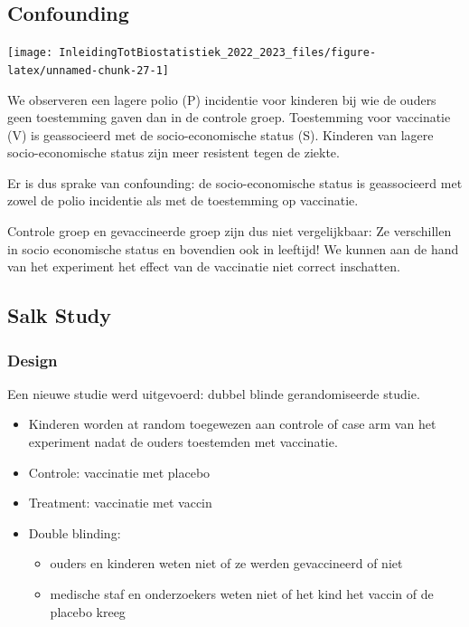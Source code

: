 \documentclass[
  12pt,dutch,coursenotes]{book}
\providecommand{\tightlist}{%
  \setlength{\itemsep}{0pt}\setlength{\parskip}{0pt}}
\begin{document}
\hypertarget{confounding}{%
\subsection{Confounding}\label{confounding}}

\begin{center}\texttt{[image: InleidingTotBiostatistiek\_2022\_2023\_files/figure-latex/unnamed-chunk-27-1]} \end{center}

We observeren een lagere polio (P) incidentie voor kinderen bij wie de ouders geen toestemming gaven dan in de controle groep.
Toestemming voor vaccinatie (V) is geassocieerd met de socio-economische status (S).
Kinderen van lagere socio-economische status zijn meer resistent tegen de ziekte.

Er is dus sprake van confounding: de socio-economische status is geassocieerd met zowel de polio incidentie als met de toestemming op vaccinatie.

Controle groep en gevaccineerde groep zijn dus niet vergelijkbaar:
Ze verschillen in socio economische status en bovendien ook in leeftijd!
We kunnen aan de hand van het experiment het effect van de vaccinatie niet correct inschatten.

\hypertarget{salk-study}{%
\subsection{Salk Study}\label{salk-study}}

\hypertarget{design-1}{%
\subsubsection{Design}\label{design-1}}

Een nieuwe studie werd uitgevoerd: dubbel blinde gerandomiseerde studie.

\begin{itemize}
\tightlist
\item
  Kinderen worden at random toegewezen aan controle of case arm van het experiment nadat de ouders toestemden met vaccinatie.
\item
  Controle: vaccinatie met placebo
\item
  Treatment: vaccinatie met vaccin
\item
  Double blinding:

  \begin{itemize}
  \tightlist
  \item
    ouders en kinderen weten niet of ze werden gevaccineerd of niet
  \item
    medische staf en onderzoekers weten niet of het kind het vaccin of de placebo kreeg
  \end{itemize}
\end{itemize}
\end{document}
